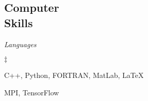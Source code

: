 \documentclass[margin,line]{res}
\newenvironment{list2}{
  \begin{list}{$\ddagger$}{%
      \setlength{\itemsep}{0in}
      \setlength{\parsep}{0in} \setlength{\parskip}{0in}
      \setlength{\topsep}{0in} \setlength{\partopsep}{0in}
      \setlength{\leftmargin}{0.2in}}}{\end{list}}
\begin{document}
\begin{resume}


\section{\sc Computer \\ Skills}

\textit{Languages}
\vspace{0.05in}
\begin{list2} 
\item C++, Python, FORTRAN, MatLab, \LaTeX
\item MPI, TensorFlow
\end{list2} 




\end{resume} 
\end{document}
